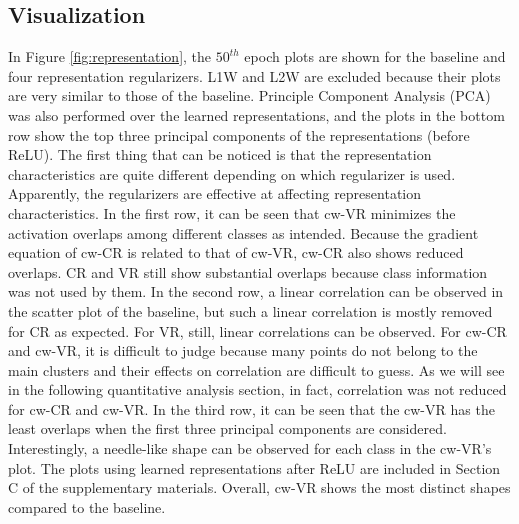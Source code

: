 \documentclass[letterpaper]{article} %
\begin{document}
\subsection{Visualization}
In Figure \ref{fig:representation}, the $50^{th}$ epoch plots are shown for the baseline and four representation regularizers. L1W and L2W are excluded because their plots are very similar to those of the baseline.
Principle Component Analysis (PCA) was also performed over the learned representations, and the plots in the bottom row show the top three principal components of the representations (before ReLU).
The first thing that can be noticed is that the representation characteristics are quite different depending on which regularizer is used. Apparently, the regularizers are effective at affecting representation characteristics. 
In the first row, it can be seen that cw-VR minimizes the activation overlaps among different classes as intended. Because the gradient equation of cw-CR is related to that of cw-VR, cw-CR also shows reduced overlaps. CR and VR still show substantial overlaps because class information was not used by them. 
In the second row, a linear correlation can be observed in the scatter plot of the baseline, but such a linear correlation is mostly removed for CR as expected. For VR, still, linear correlations can be observed. For cw-CR and cw-VR, it is difficult to judge because many points do not belong to the main clusters and their effects on correlation are difficult to guess. As we will see in the following quantitative analysis section, in fact, correlation was not reduced for cw-CR and cw-VR.
In the third row, it can be seen that the cw-VR has the least overlaps when the first three principal components are considered. Interestingly, a needle-like shape can be observed for each class in the cw-VR's plot. The plots using learned representations after ReLU are included in Section C of the supplementary materials. Overall, cw-VR shows the most distinct shapes compared to the baseline. 
\end{document}

